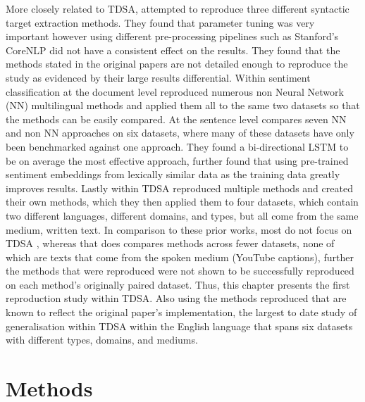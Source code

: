 More closely related to TDSA, \citet{marrese-taylor-matsuo-2017-replication} attempted to reproduce three different syntactic target extraction methods. They found that parameter tuning was very important however using different pre-processing pipelines such as Stanford's CoreNLP did not have a consistent effect on the results. They found that the methods stated in the original papers are not detailed enough to reproduce the study as evidenced by their large results differential. Within sentiment classification at the document level \citet{dashtipour2016multilingual} reproduced numerous non Neural Network (NN) multilingual methods and applied them all to the same two datasets so that the methods can be easily compared. At the sentence level \citet{barnes-etal-2017-assessing} compares seven NN and non NN approaches on six datasets, where many of these datasets have only been benchmarked against one approach. They found a bi-directional LSTM to be on average the most effective approach, further found that using pre-trained sentiment embeddings from lexically similar data as the training data greatly improves results. Lastly within TDSA \citet{chen-etal-2017-recurrent} reproduced multiple methods and created their own methods, which they then applied them to four datasets, which contain two different languages, different domains, and types, but all come from the same medium, written text. In comparison to these prior works, most do not focus on TDSA \citep{marrese-taylor-matsuo-2017-replication, dashtipour2016multilingual, barnes-etal-2017-assessing}, whereas \citet{chen-etal-2017-recurrent} that does compares methods across fewer datasets, none of which are texts that come from the spoken medium (YouTube captions), further the methods that were reproduced were not shown to be successfully reproduced on each method's originally paired dataset. Thus, this chapter presents the first reproduction study within TDSA. Also using the methods reproduced that are known to reflect the original paper's implementation, the largest to date study of generalisation within TDSA within the English language that spans six datasets with different types, domains, and mediums.

\section{Methods}
\label{section:repro_methods}

